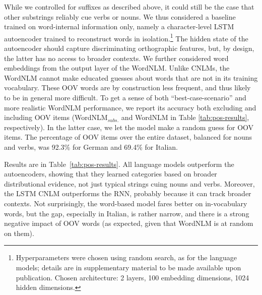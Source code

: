 While we controlled for suffixes as described above, it could still be
the case that other substrings reliably cue verbs or nouns. We thus
considered a baseline trained on word-internal information only,
namely a character-level LSTM autoencoder trained to reconstruct words
in isolation.\footnote{Hyperparameters were chosen using random search, as for the language models; details are in supplementary material to be made available upon publication. Chosen architecture: 2 layers, 100 embedding dimensions, 1024 hidden dimensions.}
The hidden state of the autoencoder should capture
discriminating orthographic features, but, by design, the latter has
no access to broader contexts.  We further considered word embeddings
from the output layer of the WordNLM. Unlike CNLMs, the WordNLM cannot
make educated guesses about words that are not in its training
vocabulary. These OOV words are by construction less frequent, and
thus likely to be in general more difficult. To get a sense of both
``best-case-scenario'' and more realistic WordNLM performance, we
report its accuracy both excluding and including OOV items
(WordNLM$_{\textit{subs.}}$ and WordNLM in Table
\ref{tab:pos-results}, respectively). In the latter case, we let the
model make a random guess for OOV items.  The percentage of OOV items
over the entire dataset, balanced for nouns and verbs, was 92.3\% for
German and 69.4\% for Italian.

Results are in Table~\ref{tab:pos-results}.  All language models
outperform the autoencoders, showing that they learned categories
based on broader distributional evidence, not just typical strings
cuing nouns and verbs. Moreover, the LSTM CNLM outperforms the RNN,
probably because it can track broader contexts. Not surprisingly, the
word-based model fares better on in-vocabulary words, but the gap,
especially in Italian, is rather narrow, and there is a strong
negative impact of OOV
words (as expected, given that WordNLM is at random on them). %

